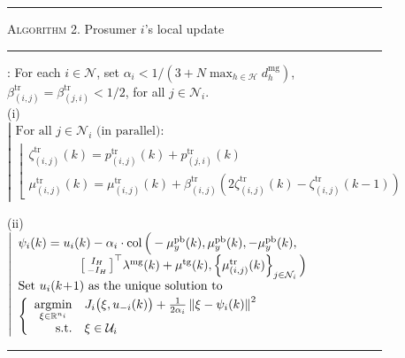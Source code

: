 \documentclass{IEEEtran}  %
\newcommand{\mc}{\mathcal}
\newcommand{\bb}{\mathbb}
\newcommand{\R}{\bb R}
\newcommand{\argmin}{\operatorname{argmin}}
\newcommand{\col}{\operatorname{col}}
\newcommand{\0}{\mathbf{0}}
\newcommand{\1}{\mathbf{1}}
\begin{document}
\begin{figure}[t]
{
\begin{minipage}{\columnwidth}
\hrule
\smallskip
\textsc{Algorithm 2}. Prosumer $i$'s local update
\smallskip
\hrule 
\smallskip
{}: For each $i \in \mc N$, set $\alpha_{i} <1/(3+N\max_{h\in \mc H} d_h^{\mathrm{mg}})$, $\beta_{(i,j)}^{\text{tr}}=\beta_{(j,i)}^{\text{tr}} < 1/2$, for all $j \in \mc N_i$.\\
\medskip
\noindent 
(i) \\[.2em]
\hspace*{.15em}
$
\left| 
\begin{array}{l}
\text{For all } j \in \mc N_i \text{ (in parallel):}\\
\left\lfloor
\begin{array}{l}
\zeta^{\text{tr}}_{(i,j)}(k)  =  p^{\textrm{tr}}_{(i,j)} (k) + p^{\textrm{tr}}_{(j,i)} (k)\\
\mu^{\text{tr}}_{(i,j)}(k) = \mu^{\text{tr}}_{(i,j)}(k) + \beta_{(i,j)}^{\text{tr}} \left( 
	2  \zeta^{\text{tr}}_{(i,j)}(k) - \zeta^{\text{tr}}_{(i,j)}(k\!-\!1)
	\right)
\end{array}
\right.
\end{array}
\right.
$

\medskip
\noindent
(ii) \\[.2em]
\hspace*{.15em}
$
\left| 
\begin{array}{l}
\psi_i(k) = u_i(k)-
	\alpha_i \cdot \col \Big(-\mu_y^{\text{pb}}(k),{\mu_y^{\text{pb}}(k), -\mu_y^{\text{pb}}(k),}\\
	\hspace*{5em}
	{
	\left[
	\begin{smallmatrix}
	I_H\\
	- I_H 
	\end{smallmatrix}
	\right] 
	}^\top \lambda^{\text{mg}}(k) + \mu^{\text{tg}}(k),
	\left\{ {\mu^{\text{tr}}_{(i,j)}(k)}\right\}_{j \in \mc N_i}   \Big)\\
%
\text{Set } u_i(k\!+\!1) \text{ as the unique solution to}\\[.2em]	
\left\{
\begin{array}{r l}
	\underset{\xi \in \R^{n_i}}{\argmin} & 
	 J_{i} \big( \xi, u_{-i}(k) \big) 
	+ \frac{1}{2 \alpha_i}
	\left\| \xi -  \psi_i(k) 
	\textstyle
	  \right\|^2 \\
	\text{s.t.} & \xi \in \mc U_i
\end{array} 
	\right.
\end{array}	
\right.		$

\medskip
\hrule
\end{minipage}
}
\end{figure}
\end{document}
